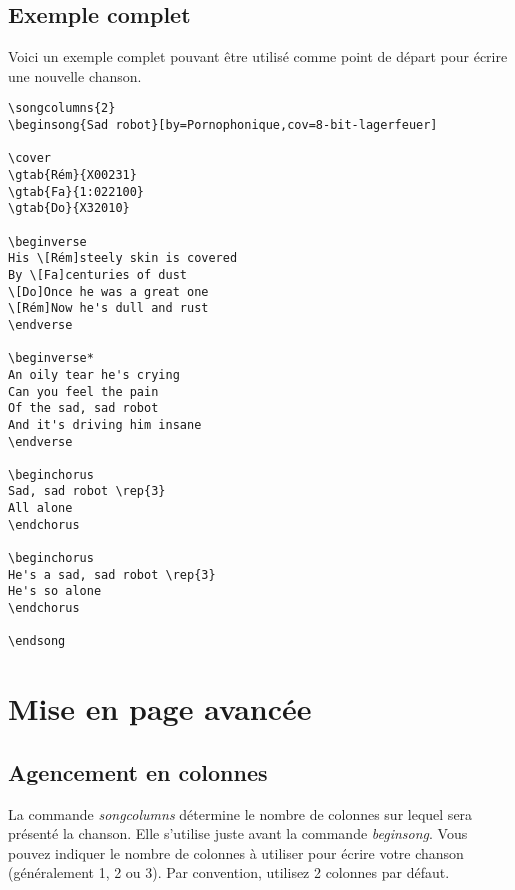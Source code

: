 \documentclass[a4paper]{article}
\begin{document}
\subsection{Exemple complet}

Voici un exemple complet pouvant être utilisé comme point de départ
pour écrire une nouvelle chanson.

\begin{verbatim}
\songcolumns{2}
\beginsong{Sad robot}[by=Pornophonique,cov=8-bit-lagerfeuer]

\cover
\gtab{Rém}{X00231}
\gtab{Fa}{1:022100}
\gtab{Do}{X32010}

\beginverse
His \[Rém]steely skin is covered
By \[Fa]centuries of dust
\[Do]Once he was a great one
\[Rém]Now he's dull and rust
\endverse

\beginverse*
An oily tear he's crying
Can you feel the pain
Of the sad, sad robot
And it's driving him insane
\endverse

\beginchorus
Sad, sad robot \rep{3}
All alone
\endchorus

\beginchorus
He's a sad, sad robot \rep{3}
He's so alone
\endchorus

\endsong
\end{verbatim}

\section{Mise en page avancée}

\subsection{Agencement en colonnes}

La commande \emph{songcolumns} détermine le nombre de colonnes sur
lequel sera présenté la chanson. Elle s'utilise juste avant la
commande \emph{beginsong}. Vous pouvez indiquer le nombre de colonnes
à utiliser pour écrire votre chanson (généralement 1, 2 ou 3). Par
convention, utilisez 2 colonnes par défaut.
\end{document}
